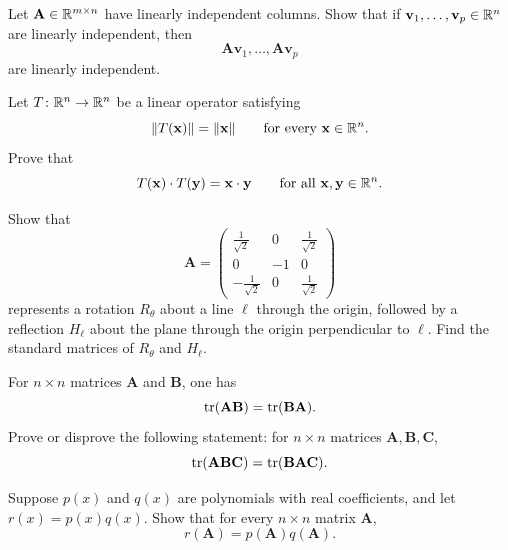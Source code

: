 \documentclass[11pt,oneside]{article}
\begin{document}
\begin{problem}
Let $\mathbf A\in\mathbb{R}^{m\times n}$ have linearly independent columns. Show that if $\mathbf v_1,\dots,\mathbf v_p\in\mathbb{R}^n$ are linearly independent, then
\[
\mathbf A\mathbf v_1,\dots,\mathbf A\mathbf v_p
\]
are linearly independent.
\end{problem}

\begin{problem}
Let $T\colon\mathbb{R}^n\to\mathbb{R}^n$ be a linear operator satisfying
\[
\|T(\mathbf x)\|=\|\mathbf x\|
\qquad\text{for every }\mathbf x\in\mathbb{R}^n.
\]
Prove that
\[
T(\mathbf x)\cdot T(\mathbf y)=\mathbf x\cdot\mathbf y
\qquad\text{for all }\mathbf x,\mathbf y\in\mathbb{R}^n.
\]
\end{problem}

\begin{problem}
Show that
\[
\mathbf A=
\begin{pmatrix}
\frac{1}{\sqrt2}&0&\frac{1}{\sqrt2}\\
0&-1&0\\
-\frac{1}{\sqrt2}&0&\frac{1}{\sqrt2}
\end{pmatrix}
\]
represents a rotation $R_\theta$ about a line $\ell$ through the origin, followed by a reflection $H_\ell$ about the plane through the origin perpendicular to $\ell$. Find the standard matrices of $R_\theta$ and $H_\ell$.
\end{problem}

\begin{problem}
For $n\times n$ matrices $\mathbf A$ and $\mathbf B$, one has
\[
\operatorname{tr}(\mathbf A\mathbf B)=\operatorname{tr}(\mathbf B\mathbf A).
\]
Prove or disprove the following statement: for $n\times n$ matrices $\mathbf A,\mathbf B,\mathbf C$,
\[
\operatorname{tr}(\mathbf A\mathbf B\mathbf C)=\operatorname{tr}(\mathbf B\mathbf A\mathbf C).
\]
\end{problem}

\begin{problem}
Suppose $p(x)$ and $q(x)$ are polynomials with real coefficients, and let $r(x)=p(x)q(x)$. Show that for every $n\times n$ matrix $\mathbf A$,
\[
r(\mathbf A)=p(\mathbf A)q(\mathbf A).
\]
\end{problem}
\end{document}
